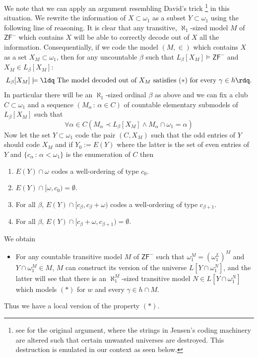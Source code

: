\documentclass[a4paper,11pt]{article}
\newcommand{\ZFP}{\mathsf{ZF}^-}
\begin{document}
We note that we can apply an argument resembling David's trick \footnote{see \cite{David} for the original argument, where the strings in Jensen's coding machinery are altered such that certain unwanted universes are destroyed. This destruction is emulated in our context as seen below.} in this situation. We rewrite the information of $X \subset \omega_1$ as a subset $Y \subset \omega_1$ using the following line of reasoning.
It is clear that any transitive, $\aleph_1$-sized model $M$ of $\ZFP$ which contains $X$ will be able to correctly decode out of $X$ all the information.
Consequentially, if we code the model $(M,\in)$ which contains $X$ as a set $X_M \subset \omega_1$, then for any uncountable $\beta$ such that $L_{\beta}[X_M] \models \ZFP$ and $X_M \in L_{\beta}[X_M]$:
\[L_{\beta}[X_M] \models \text{\ldq The model decoded out of }X_M \text{ satisfies $(\ast)$ for every $\gamma \in h$\rdq.} \]
In particular there will be an $\aleph_1$-sized ordinal $\beta$ as above and we can fix a club $C \subset \omega_1$ and a sequence $(M_{\alpha} \, : \, \alpha \in C)$ of countable elementary submodels  of $L_{\beta} [X_M]$ such that
\[\forall \alpha \in C (M_{\alpha} \prec L_{\beta}[X_M] \land M_{\alpha} \cap \omega_1 = \alpha)\]
Now let the set $Y\subset \omega_1$ code the pair $(C, X_M)$ such that the odd entries of $Y$ should code $X_M$ and if $Y_0:=E(Y)$ where the latter is the set of even entries of $Y$ and $\{c_{\alpha} \, : \, \alpha < \omega_1\}$ is the enumeration of $C$ then
\begin{enumerate}
\item $E(Y) \cap \omega$ codes a well-ordering of type $c_0$.
\item $E(Y) \cap [\omega, c_0) = \emptyset$.
\item For all $\beta$, $E(Y) \cap [c_{\beta}, c_{\beta} + \omega)$ codes a well-ordering of type $c_{\beta+1}$.
\item For all $\beta$, $E(Y) \cap [c_{\beta}+\omega, c_{\beta+1})= \emptyset$.
\end{enumerate}
We obtain
\begin{itemize}
\item[$({\ast}{\ast})$] For any countable transitive model $M$ of $\ZFP$ such that $\omega_1^M=(\omega_1^L)^M$ and $ Y \cap \omega_1^M \in M$, $M$ can construct its version of the universe $L[Y \cap \omega_1^N]$, and the latter will see that there is an $\aleph_1^M$-sized transitive model $N \in L[Y \cap \omega_1^N]$ which models $(\ast)$ for $w$ and every $\gamma \in h \cap M$.
\end{itemize}
Thus we have a local version of the property $(\ast)$.
\end{document}
